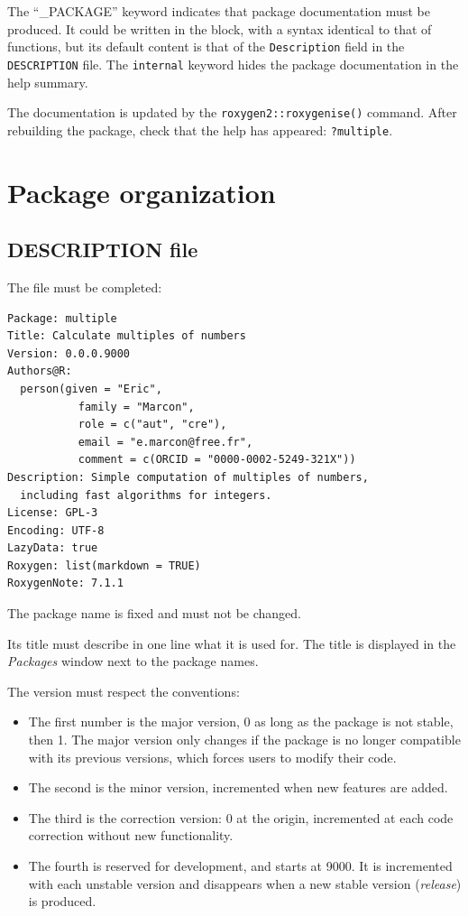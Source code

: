 \documentclass[
  12pt,
  american,
  a4paper,
  extrafontsizes,onecolumn,openright
  ]{memoir}
\providecommand{\tightlist}{%
  \setlength{\itemsep}{0pt}\setlength{\parskip}{0pt}}
\begin{document}
The ``\_PACKAGE'' keyword indicates that package documentation must be produced.
It could be written in the block, with a syntax identical to that of functions, but its default content is that of the \texttt{Description} field in the \texttt{DESCRIPTION} file.
The \texttt{internal} keyword hides the package documentation in the help summary.

The documentation is updated by the \texttt{roxygen2::roxygenise()} command.
After rebuilding the package, check that the help has appeared: \texttt{?multiple}.

\section{Package organization}\label{package-organization}

\subsection{DESCRIPTION file}\label{sec:package-description}

The file must be completed:

\begin{verbatim}
Package: multiple
Title: Calculate multiples of numbers
Version: 0.0.0.9000
Authors@R: 
  person(given = "Eric",
           family = "Marcon",
           role = c("aut", "cre"),
           email = "e.marcon@free.fr",
           comment = c(ORCID = "0000-0002-5249-321X"))
Description: Simple computation of multiples of numbers, 
  including fast algorithms for integers.
License: GPL-3
Encoding: UTF-8
LazyData: true
Roxygen: list(markdown = TRUE)
RoxygenNote: 7.1.1
\end{verbatim}

The package name is fixed and must not be changed.

Its title must describe in one line what it is used for.
The title is displayed in the \emph{Packages} window next to the package names.

The version must respect the conventions:

\begin{itemize}
\tightlist
\item
  The first number is the major version, 0 as long as the package is not stable, then 1.
  The major version only changes if the package is no longer compatible with its previous versions, which forces users to modify their code.
\item
  The second is the minor version, incremented when new features are added.
\item
  The third is the correction version: 0 at the origin, incremented at each code correction without new functionality.
\item
  The fourth is reserved for development, and starts at 9000.
  It is incremented with each unstable version and disappears when a new stable version (\emph{release}) is produced.
\end{itemize}
\end{document}
